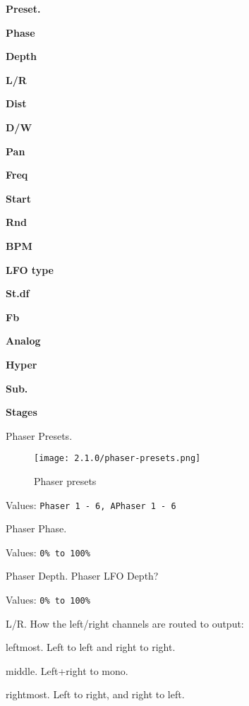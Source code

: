 
   \begin{enumber}
      \item \textbf{Preset.}
      \item \textbf{Phase}
      \item \textbf{Depth}
      \item \textbf{L/R}
      \item \textbf{Dist}
      \item \textbf{D/W}
      \item \textbf{Pan}
      \item \textbf{Freq}
      \item \textbf{Start}
      \item \textbf{Rnd}
      \item \textbf{BPM}
      \item \textbf{LFO type}
      \item \textbf{St.df}
      \item \textbf{Fb}
      \item \textbf{Analog}
      \item \textbf{Hyper}
      \item \textbf{Sub.}
      \item \textbf{Stages}

   \end{enumber}


   Phaser Presets.

\begin{figure}[H]
   \centering
   \texttt{[image: 2.1.0/phaser-presets.png]}
   \caption{Phaser presets}
   \label{fig:phaser-presets}
\end{figure}
   Values: \texttt{Phaser 1 - 6, APhaser 1 - 6}

   Phaser Phase.

   Values: \texttt{0\% to 100\%}

   Phaser Depth. Phaser LFO Depth?

   Values: \texttt{0\% to 100\%}

   L/R. How the left/right channels are routed to output:

      \begin{enumber}
         \item leftmost. Left to left and right to right.
         \item middle. Left+right to mono.
         \item rightmost. Left to right, and right to left.
      \end{enumber}

